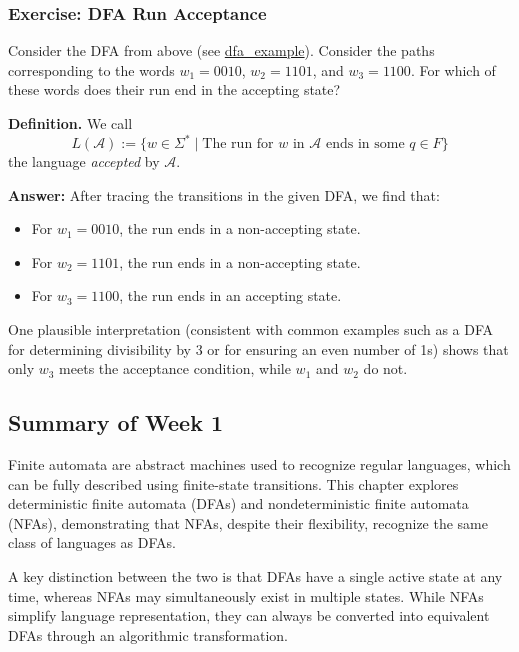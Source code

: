 \documentclass{article}
\theoremstyle{theorem}
\theoremstyle{definition}
\theoremstyle{remark}
\begin{document}
\subsubsection*{Exercise: DFA Run Acceptance}

Consider the DFA from above (see \href{https://hackmd.io/_uploads/ByLSmw_tyl.jpg}{dfa\_example}). Consider the paths corresponding to the words \(w_1 = 0010\), \(w_2 = 1101\), and \(w_3 = 1100\). For which of these words does their run end in the accepting state?

\textbf{Definition.} We call
\[
L(\mathcal{A}) := \{w \in \Sigma^* \; | \; \text{The run for \(w\) in \(\mathcal{A}\) ends in some \(q \in F\)} \}
\]
the language \textit{accepted} by \(\mathcal{A}\).

\newpage

\textbf{Answer:} After tracing the transitions in the given DFA, we find that:
\begin{itemize}
    \item For \(w_1 = 0010\), the run ends in a non-accepting state.
    \item For \(w_2 = 1101\), the run ends in a non-accepting state.
    \item For \(w_3 = 1100\), the run ends in an accepting state.
\end{itemize}

One plausible interpretation (consistent with common examples such as a DFA for determining divisibility by 3 or for ensuring an even number of 1s) shows that only \(w_3\) meets the acceptance condition, while \(w_1\) and \(w_2\) do not.

\subsection*{Summary of Week 1}

Finite automata are abstract machines used to recognize regular languages, which can be fully described using finite-state transitions. This chapter explores deterministic finite automata (DFAs) and nondeterministic finite automata (NFAs), demonstrating that NFAs, despite their flexibility, recognize the same class of languages as DFAs.

A key distinction between the two is that DFAs have a single active state at any time, whereas NFAs may simultaneously exist in multiple states. While NFAs simplify language representation, they can always be converted into equivalent DFAs through an algorithmic transformation.
\end{document}
